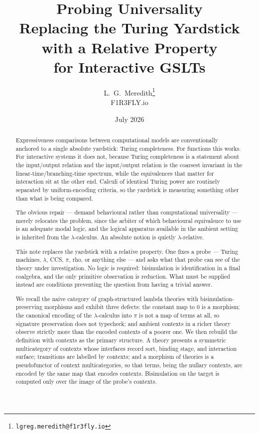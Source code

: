 \documentclass[11pt,a4paper]{article}
\title{\bf Probing Universality\\[2pt]
\large Replacing the Turing Yardstick with a Relative Property\\ for Interactive GSLTs}
\author{L.\ G.\ Meredith\thanks{\texttt{lgreg.meredith@f1r3fly.io}}\\ F1R3FLY.io}
\date{July 2026}
\theoremstyle{definition}
\theoremstyle{plain}
\theoremstyle{remark}
\begin{document}
\maketitle

\begin{abstract}
Expressiveness comparisons between computational models are conventionally
anchored to a single absolute yardstick: Turing completeness. For functions this
works. For interactive systems it does not, because Turing completeness is a
statement about the input/output relation and the input/output relation is the
coarsest invariant in the linear-time/branching-time spectrum, while the
equivalences that matter for interaction sit at the other end. Calculi of identical
Turing power are routinely separated by uniform-encoding criteria, so the yardstick
is measuring something other than what is being compared.

The obvious repair --- demand behavioural rather than computational universality ---
merely relocates the problem, since the arbiter of which behavioural equivalence to
use is an adequate modal logic, and the logical apparatus available in the ambient
setting is inherited from the $\lambda$-calculus. An absolute notion is quietly
$\lambda$-relative.

This note replaces the yardstick with a relative property. One fixes a probe --- Turing
machines, $\lambda$, CCS, $\pi$, rho, or anything else --- and asks what that probe can
see of the theory under investigation. No logic is required: bisimulation is
identification in a final coalgebra, and the only primitive observation is reduction.
What must be supplied instead are conditions preventing the question from having a
trivial answer.

We recall the naive category of graph-structured lambda theories with
bisimulation-preserving morphisms and exhibit three defects: the constant map to $0$
is a morphism; the canonical encoding of the $\lambda$-calculus into $\pi$ is not a map
of terms at all, so signature preservation does not typecheck; and ambient contexts
in a richer theory observe strictly more than the encoded contexts of a poorer one.
We then rebuild the definition with contexts as the primary structure. A theory
presents a symmetric multicategory of contexts whose interfaces record sort, binding
stage, and interaction surface; transitions are labelled by contexts; and a morphism
of theories is a pseudofunctor of context multicategories, so that terms, being the
nullary contexts, are encoded by the same map that encodes contexts. Bisimulation on
the target is computed only over the image of the probe's contexts.


\end{abstract}
\end{document}

